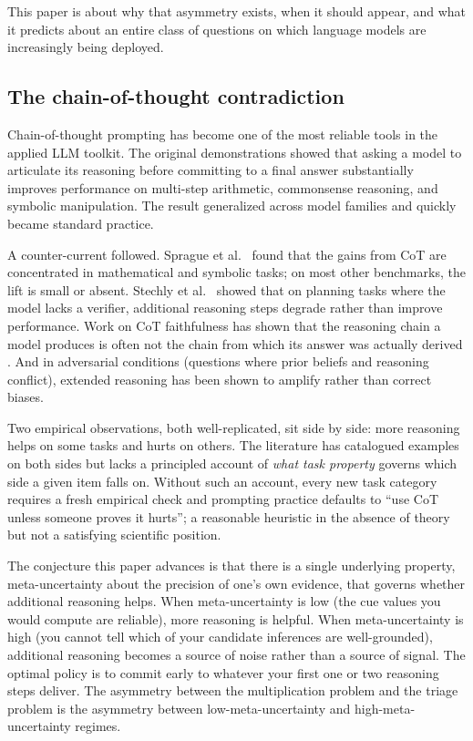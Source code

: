 \documentclass{article}
\begin{document}
This paper is about why that asymmetry exists, when it should appear,
and what it predicts about an entire class of questions on which
language models are increasingly being deployed.

\subsection{The chain-of-thought
contradiction}\label{the-chain-of-thought-contradiction}

Chain-of-thought prompting has become one of the most reliable tools in
the applied LLM toolkit. The original demonstrations \cite{wei2022, kojima2022} showed that asking a model to articulate its
reasoning before committing to a final answer substantially improves
performance on multi-step arithmetic, commonsense reasoning, and
symbolic manipulation. The result generalized across model families and
quickly became standard practice.

A counter-current followed. Sprague et al.~\cite{sprague2024} found that the gains
from CoT are concentrated in mathematical and symbolic tasks; on most
other benchmarks, the lift is small or absent. Stechly et al.~\cite{stechly2024}
showed that on planning tasks where the model lacks a verifier,
additional reasoning steps degrade rather than improve performance. Work
on CoT faithfulness has shown that the reasoning chain a model produces
is often not the chain from which its answer was actually derived
\cite{turpin2023, lanham2023}. And in adversarial
conditions (questions where prior beliefs and reasoning conflict),
extended reasoning has been shown to amplify rather than correct biases.

Two empirical observations, both well-replicated, sit side by side: more
reasoning helps on some tasks and hurts on others. The literature has
catalogued examples on both sides but lacks a principled account of
\emph{what task property} governs which side a given item falls on.
Without such an account, every new task category requires a fresh
empirical check and prompting practice defaults to ``use CoT unless
someone proves it hurts''; a reasonable heuristic in the absence of
theory but not a satisfying scientific position.

The conjecture this paper advances is that there is a single underlying
property, meta-uncertainty about the precision of one's own evidence,
that governs whether additional reasoning helps. When meta-uncertainty
is low (the cue values you would compute are reliable), more reasoning
is helpful. When meta-uncertainty is high (you cannot tell which of your
candidate inferences are well-grounded), additional reasoning becomes a
source of noise rather than a source of signal. The optimal policy is to
commit early to whatever your first one or two reasoning steps deliver.
The asymmetry between the multiplication problem and the triage problem
is the asymmetry between low-meta-uncertainty and high-meta-uncertainty
regimes.
\end{document}
